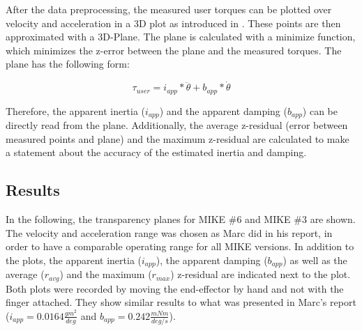 After the data preprocessing, the measured user torques can be plotted over velocity and acceleration in a 3D plot as introduced in \cite{metzger}. These points are then approximated with a 3D-Plane. The plane is calculated with a minimize function, which minimizes the z-error between the plane and the measured torques. The plane has the following form:

\begin{equation}
    \tau_{user} = i_{app}*\ddot \theta + b_{app}*\dot \theta
\end{equation}

Therefore, the apparent inertia ($i_{app}$) and the apparent damping ($b_{app}$) can be directly read from the plane. Additionally, the average z-residual (error between measured points and plane) and the maximum z-residual are calculated to make a statement about the accuracy of the estimated inertia and damping.

\subsection{Results}

In the following, the transparency planes for MIKE \#6 and MIKE \#3 are shown. The velocity and acceleration range was chosen as Marc did in his report, in order to have a comparable operating range for all MIKE versions. In addition to the plots, the apparent inertia ($i_{app}$), the apparent damping ($b_{app}$) as well as the average ($r_{avg}$) and the maximum ($r_{max}$) z-residual are indicated next to the plot. Both plots were recorded by moving the end-effector by hand and not with the finger attached. They show similar results to what was presented in Marc's report ($i_{app} = 0.0164\frac{gm^2}{deg}$ and $b_{app} = 0.242\frac{mNm}{deg/s}$). 

